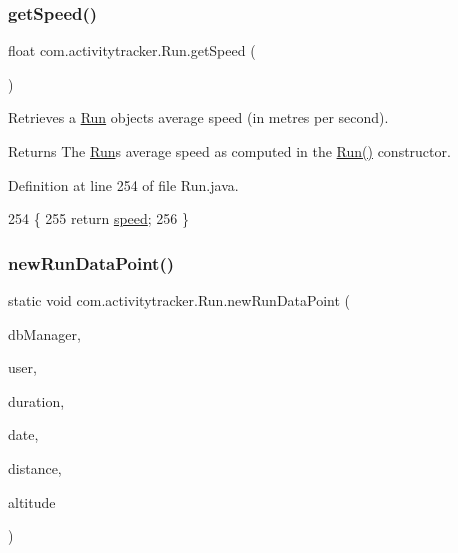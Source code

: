 \subsubsection{\texorpdfstring{get\+Speed()}{getSpeed()}}
{\footnotesize\ttfamily float com.\+activitytracker.\+Run.\+get\+Speed (\begin{DoxyParamCaption}{ }\end{DoxyParamCaption})}

Retrieves a \mbox{\hyperlink{classcom_1_1activitytracker_1_1_run}{Run}} object\textquotesingle{}s average speed (in metres per second).

\begin{DoxyReturn}{Returns}
The \mbox{\hyperlink{classcom_1_1activitytracker_1_1_run}{Run}}\textquotesingle{}s average speed as computed in the \mbox{\hyperlink{classcom_1_1activitytracker_1_1_run_a5568c1c514835056d2abc22cfba222c5}{Run()}} constructor. 
\end{DoxyReturn}


Definition at line 254 of file Run.\+java.


\begin{DoxyCode}
254                             \{
255         \textcolor{keywordflow}{return} \mbox{\hyperlink{classcom_1_1activitytracker_1_1_run_ada0c6e189d55997133cde5bbe9913984}{speed}};
256     \}
\end{DoxyCode}
\mbox{\label{classcom_1_1activitytracker_1_1_run_a5dea6f1860431103d553ce770382afe0}} 
\subsubsection{\texorpdfstring{new\+Run\+Data\+Point()}{newRunDataPoint()}}
{\footnotesize\ttfamily static void com.\+activitytracker.\+Run.\+new\+Run\+Data\+Point (\begin{DoxyParamCaption}\item[{final \mbox{\hyperlink{classcom_1_1activitytracker_1_1_d_b_manager}{D\+B\+Manager}}}]{db\+Manager,  }\item[{final \mbox{\hyperlink{classcom_1_1activitytracker_1_1_user}{User}}}]{user,  }\item[{final float}]{duration,  }\item[{final Date}]{date,  }\item[{final float}]{distance,  }\item[{final float}]{altitude }\end{DoxyParamCaption})\hspace{0.3cm}{\ttfamily [static]}}

